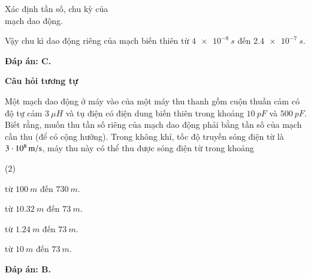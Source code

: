 \begin{dang}{Xác định tần số, chu kỳ của\\ mạch dao động.}
{		Vậy chu kì dao động riêng của mạch biến thiên từ $\SI{4 e-8}{s}$ đến $\SI{2,4 e-7}{s}$.
		
		\textbf{Đáp án: C.}
		
		
		\begin{center}
			\textbf{Câu hỏi tương tự}
		\end{center}
		
		Một mạch dao động ở máy vào của một máy thu thanh gồm cuộn thuần cảm có độ tự cảm $\SI{3}{\mu H}$ và tụ điện có điện dung biến thiên trong khoảng $\SI{10}{pF}$ và $\SI{500}{pF}$. Biết rằng, muốn thu tần số riêng của mạch dao động phải bằng tần số của mạch cần thu (để có cộng hưởng). Trong không khí, tốc độ truyền sóng điện từ là $\xsi{3\cdot10^{8}}{m/s}$, máy thu này có thể thu được sóng điện từ trong khoảng
		\begin{mcq}(2)
			\item từ $\SI{100}{m}$ đến $\SI{730}{m}$. 
			\item từ $\SI{10,32}{m}$ đến $\SI{73}{m}$. 
			\item từ $\SI{1,24}{m}$ đến $\SI{73}{m}$. 
			\item từ $\SI{10}{m}$ đến $\SI{73}{m}$. 
		\end{mcq}
		
		\textbf{Đáp án: B.}
		
	}
	
\end{dang}

